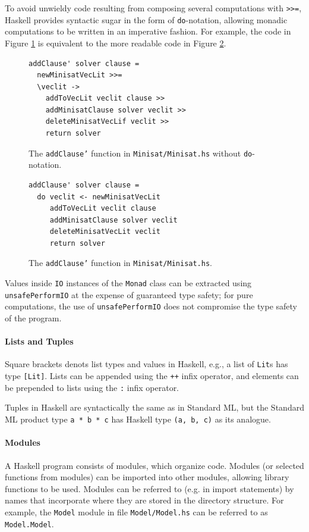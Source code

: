 \documentclass[12pt,a4paper,twoside,openright]{report}
\begin{document}
{To avoid unwieldy code resulting from composing several
computations with \verb,>>=,, Haskell provides syntactic sugar
in the form of \verb,do,-notation, allowing monadic computations
to be written in an imperative fashion. For example, the code in Figure
\ref{monad} is equivalent to the more readable code in Figure \ref{do}.

\begin{figure}[t]
\centering
\begin{lstlisting}
addClause' solver clause =
  newMinisatVecLit >>=
  \veclit ->
    addToVecLit veclit clause >> 
    addMinisatClause solver veclit >>
    deleteMinisatVecLif veclit >>
    return solver
\end{lstlisting}
\caption{The {\tt addClause'} function in {\tt Minisat/Minisat.hs} without
{\tt do}-notation.}
\label{monad}
\end{figure}
\begin{figure}[t]
\centering
\begin{lstlisting}
addClause' solver clause =
  do veclit <- newMinisatVecLit
     addToVecLit veclit clause
     addMinisatClause solver veclit
     deleteMinisatVecLit veclit
     return solver
\end{lstlisting}
\caption{The {\tt addClause'} function in {\tt Minisat/Minisat.hs}.}
\label{do}
\end{figure}

Values inside \verb,IO, instances of the \verb,Monad, class can be extracted
using \verb,unsafePerformIO, at the expense of guaranteed type safety; for pure
computations, the use of \verb,unsafePerformIO, does not compromise the type
safety of the program.
}

\paragraph{Lists and Tuples}{
Square brackets denots list types and values in Haskell, e.g.,
a list of \verb,Lit,s has type \verb,[Lit],.
Lists can be appended using the \verb,++, infix operator, and elements
can be prepended to lists using the \verb,:, infix operator.

Tuples in Haskell are syntactically the same as in Standard ML, but the
Standard ML product type \verb,a * b * c, has Haskell type \verb.(a, b, c).
as its analogue.
}

\paragraph{Modules}{
A Haskell program consists of modules, which organize code.
Modules (or selected functions from modules) can be imported into other
modules, allowing library functions to be used. Modules can be referred
to (e.g. in import statements) by names that incorporate where they are
stored in the directory structure. For example, the \verb,Model, module in file
\verb,Model/Model.hs, can be referred to as \verb,Model.Model,.
}
\end{document}
